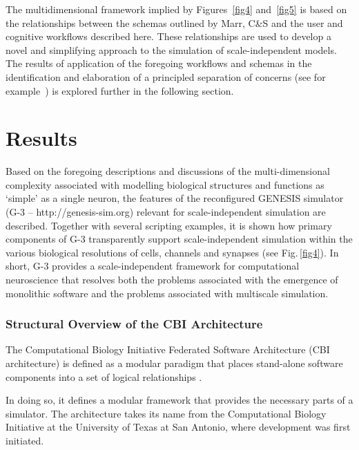 \documentclass[10pt,letterpaper]{article}
\begin{document}
The multidimensional framework implied by Figures~\ref{fig4} and~\ref{fig5} is based on the relationships between the schemas outlined by Marr, C\&S and the user and cognitive workflows described here. These relationships are used to develop a novel and simplifying approach to the simulation of scale-independent models. The results of application of the foregoing workflows and schemas in the identification and elaboration of a principled separation of concerns (see for example~\cite{Dijkstra:1982fu}) is explored further in the following section.

\section*{Results}

Based on the foregoing descriptions and discussions of the multi-dimensional complexity associated with modelling biological structures and functions as ‘simple’ as a single neuron, the features of the reconfigured GENESIS simulator (G-3 -- http://genesis-sim.org) relevant for scale-independent simulation are described.  Together with several scripting examples, it is shown how primary components of G-3 transparently support scale-independent simulation within the various biological resolutions of cells, channels and synapses (see Fig.\,\ref{fig4}). In short, G-3 provides a scale-independent framework for computational neuroscience that resolves both the problems associated with the emergence of monolithic software and the problems associated with multiscale simulation.

\subsubsection*{Structural Overview of the CBI Architecture}

The Computational Biology Initiative Federated Software Architecture (CBI architecture) is defined as a modular paradigm that places stand-alone software components into a set of logical relationships \cite{cornelis12}.

In doing so, it defines a modular framework that provides the
necessary parts of a simulator. The architecture takes its name from the Computational Biology Initiative at the University of Texas at San Antonio, where development was first initiated.
\end{document}
